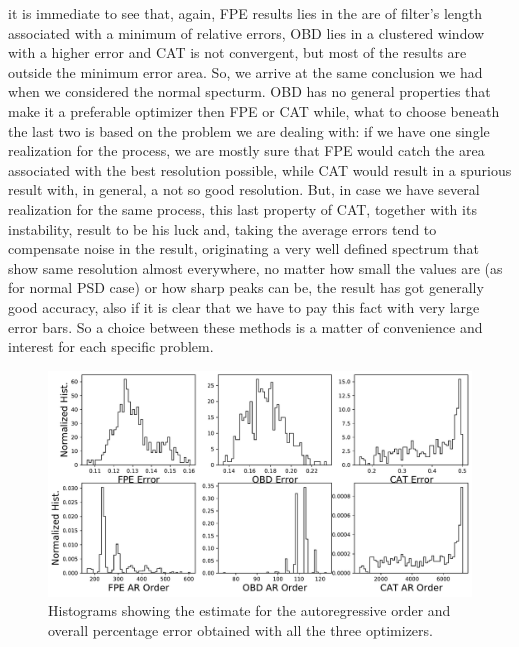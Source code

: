 \documentclass[twocolumn,showpacs,preprintnumbers,nofootinbib,prd,
superscriptaddress,10pt]{revtex4-1}
\begin{document}
it is immediate to see that, again, FPE results lies in the are of filter's length associated with a minimum of relative errors, OBD lies in a clustered window with a higher error and CAT is not convergent, but most of the results are outside the minimum error area. So, we arrive at the same conclusion we had when we considered the normal specturm. OBD has no general properties that make it a preferable optimizer then FPE or CAT while, what to choose beneath the last two is based on the problem we are dealing with: if we have one single realization for the process, we are mostly sure that FPE would catch the area associated with the best resolution possible, while CAT would result in a spurious result with, in general, a not so good resolution. But, in case we have several realization for the same process, this last property of CAT, together with its instability, result to be his luck and, taking the average errors tend to compensate noise in the result, originating a very well defined spectrum that show same resolution almost everywhere, no matter how small the values are (as for normal PSD case) or how sharp peaks can be, the result has got generally good accuracy, also if it is clear that we have to pay this fact with very large error bars. So a choice between these methods is a matter of convenience and interest for each specific problem. \\
\begin{figure}
    \centering
    \includegraphics[width = \linewidth]{Images/LIGOsimulate/LigoHists.pdf}
    \caption{Histograms showing the estimate for the autoregressive order and overall percentage error obtained with all the three optimizers.}
    \label{fig:my_label}
\end{figure}
 
 
 
 
 
\end{document}
